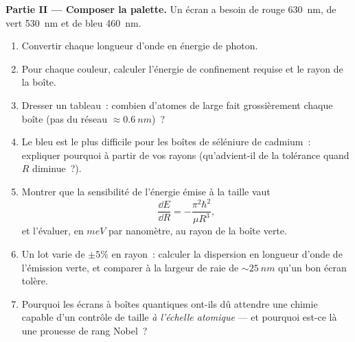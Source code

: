 \begin{problem}
\medskip\noindent\textbf{Partie II --- Composer la palette.}
Un écran a besoin de rouge \qty{630}{nm}, de vert \qty{530}{nm} et de
bleu \qty{460}{nm}.
\begin{enumerate}[resume]
  \item Convertir chaque longueur d'onde en énergie de photon.
  \item Pour chaque couleur, calculer l'énergie de confinement requise
        et le rayon de la boîte.
  \item Dresser un tableau~: combien d'atomes de large fait grossièrement
        chaque boîte (pas du réseau $\approx \qty{0.6}{nm}$)~?
  \item Le bleu est le plus difficile pour les boîtes de séléniure de
        cadmium~: expliquer pourquoi à partir de vos rayons (qu'advient-il
        de la tolérance quand $R$ diminue~?).
  \item Montrer que la sensibilité de l'énergie émise à la taille vaut
        \[
        \frac{\dd E}{\dd R} = -\frac{\pi^2\hbar^2}{\mu R^3} ,
        \]
        et l'évaluer, en $\unit{meV}$ par nanomètre, au rayon de la
        boîte verte.
  \item Un lot varie de $\pm5\%$ en rayon~: calculer la dispersion en
        longueur d'onde de l'émission verte, et comparer à la largeur
        de raie de $\sim\qty{25}{nm}$ qu'un bon écran tolère.
  \item Pourquoi les écrans à boîtes quantiques ont-ils dû attendre une
        chimie capable d'un contrôle de taille \emph{à l'échelle
        atomique} --- et pourquoi est-ce là une prouesse de rang Nobel~?
\end{enumerate}


\end{problem}

